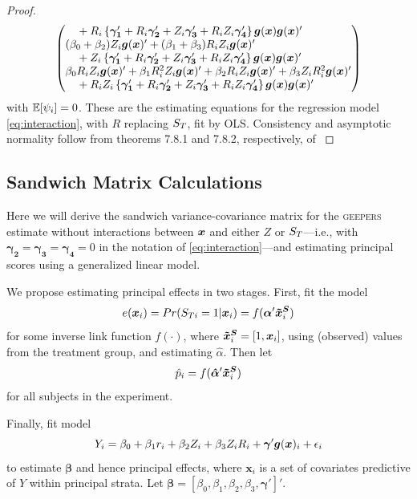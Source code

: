 \documentclass[]{article}
\begin{document}
\begin{proof}
\begin{equation*}
\begin{split}
\begin{pmatrix*}[l]
    \quad {}+\ri\left\{\bm{\gamma_1}'+R_i\bm{\gamma_2}'+Z_i\bm{\gamma_3}'+R_iZ_i\bm{\gamma_4}'\right\}\bxy\bxyt\\
        (\beta_0+\beta_2)Z_i\bxyt+(\beta_1+\beta_3)R_iZ_i\bxyt\\
    \quad {}+Z_i\left\{\bm{\gamma_1}'+R_i\bm{\gamma_2}'+Z_i\bm{\gamma_3}'+R_iZ_i\bm{\gamma_4}'\right\}\bxy\bxyt\\
\beta_0\ri Z_i\bxyt+\beta_1R_i^2Z_i\bxyt+\beta_2\ri Z_i\bxyt+\beta_3Z_iR_i^2\bxyt\\
    \quad {}+\ri Z_i\left\{\bm{\gamma_1}'+R_i\bm{\gamma_2}'+Z_i\bm{\gamma_3}'+R_iZ_i\bm{\gamma_4}'\right\}\bxy\bxyt\\
  \end{pmatrix*}
  \end{split}
\end{equation*}
with $\mathbb{E}[\psi_i]=0$.
These are the estimating equations for the regression model \eqref{eq:interaction}, with $R$ replacing $S_T$, fit by OLS.
Consistency and asymptotic normality follow from theorems 7.8.1 and 7.8.2, respectively, of \citet{boosStefanskiBook}
\end{proof}

\subsection{Sandwich Matrix Calculations}

Here we will derive the sandwich variance-covariance matrix for the \textsc{geepers} estimate without interactions between $\bm{x}$ and either $Z$ or $S_T$---i.e., with $\bm{\gamma_2}=\bm{\gamma_3}=\bm{\gamma_4}=0$ in the notation of \eqref{eq:interaction}---and estimating principal scores using a generalized linear model.

We propose estimating principal effects in two stages.
First, fit the model
\begin{equation}\label{eq:psMod}
  e(\bm{x}_i)=Pr(S_{Ti}=1|\bm{x}_i)=f(\bm{\alpha}'\bm{\tilde{x}^S}_i)
\end{equation}
for some inverse link function $f(\cdot)$, where $\bm{\tilde{x}^S}_i=[1,\bm{x}_i]$, using (observed) values from the treatment group, and estimating $\hat{\alpha}$.
Then let
\begin{equation}\label{eq:ps}
  \hat{p}_i=f(\bm{\hat{\alpha}}'\bm{\tilde{x}^S}_i)
\end{equation}
for all subjects in the experiment.

Finally, fit model
\begin{equation}\label{eq:regression}
  Y_i=\beta_0+\beta_1r_i+\beta_2Z_i+\beta_3Z_iR_i+\bm{\gamma}'\bm{g}(\bm{x})_i+\epsilon_i
\end{equation}
to estimate $\bm{\beta}$ and hence principal effects, where $\bm{x}_i$ is a set of covariates predictive of $Y$ within principal strata.
Let $\bm{\beta}=[\beta_0,\beta_1,\beta_2,\beta_3,\bm{\gamma}']'$.
\end{document}
